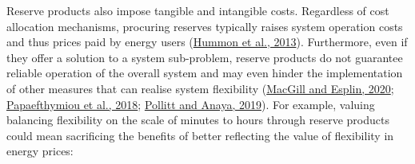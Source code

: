 \documentclass[12pt,a4paper,]{report}
\begin{document}
Reserve products also impose tangible and intangible costs. Regardless
of cost allocation mechanisms, procuring reserves typically raises
system operation costs and thus prices paid by energy users
(\protect\hyperlink{ref-hummonFundamentalDriversCost2013}{Hummon et al.,
2013}). Furthermore, even if they offer a solution to a system
sub-problem, reserve products do not guarantee reliable operation of the
overall system and may even hinder the implementation of other measures
that can realise system flexibility
(\protect\hyperlink{ref-macgillEndtoendElectricityMarket2020}{MacGill
and Esplin, 2020};
\protect\hyperlink{ref-papaefthymiouPowerSystemFlexibility2018}{Papaefthymiou
et al., 2018};
\protect\hyperlink{ref-pollittCompetitionMarketsAncillary2019}{Pollitt
and Anaya, 2019}). For example, valuing balancing flexibility on the
scale of minutes to hours through reserve products could mean
sacrificing the benefits of better reflecting the value of flexibility
in energy prices:
\end{document}
